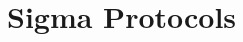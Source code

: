\documentclass{zkdl-template-105x135-nohead}
\begin{document}











    \section{Sigma Protocols} \label{section:sigma}

    


\end{document}
